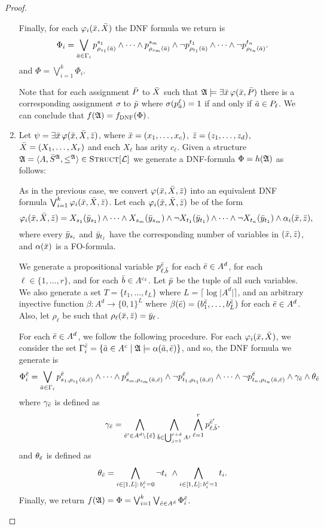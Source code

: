 \begin{proof}
\begin{enumerate}
		Finally, for each $\varphi_i(\x,\X)$ the DNF formula we return is
		\[
		\Phi_i = \bigvee_{\a\in\Gamma_i} p^{s_1}_{\rho_{s_1}(\a)} \wedge \cdots \wedge p^{s_m}_{\rho_{s_m}(\a)} \wedge \neg p^{t_1}_{\rho_{t_1}(\a)} \wedge \cdots \wedge \neg p^{t_n}_{\rho_{t_n}(\a)}.
		\]
		and $\Phi = \bigvee_{i = 1}^k \Phi_i$.
		
		Note that for each assignment $\P$ to $\X$ such that $\A\models\exists\x\,\varphi(\x,\P)$ there is a corresponding assignment $\sigma$ to $\p$ where $\sigma(p^{\ell}_{\a}) = 1$ if and only if $\a\in P_{\ell}$. We can conclude that $f(\A) = f_{\textsc{DNF}}(\Phi)$.
		
		\item Let $\psi = \exists \x\,\varphi(\x,\X,\z)$, where $\x = (x_1,\ldots,x_c)$, $\z = (z_1,\ldots,z_d)$, $\X = (X_1,\ldots,X_r)$ and each $X_{\ell}$ has arity $c_{\ell}$. Given a structure $\A = \langle A, \S^{\A}, \leq^{\A} \rangle\in\Truc$ we generate a DNF-formula $\Phi = h(\A)$ as follows:
		
		As in the previous case, we convert $\varphi(\x,\X,\z)$ into an equivalent DNF formula $\bigvee_{i = 1}^k \varphi_{i}(\x,\X,\z)$. Let each $\varphi_{i}(\x,\X,\z)$ be of the form
		\[
		\varphi_{i}(\x,\X,\z) = X_{s_1}(\y_{s_1}) \wedge \cdots \wedge X_{s_m}(\y_{s_m}) \wedge \neg X_{t_1}(\y_{t_1}) \wedge \cdots \wedge \neg X_{t_n}(\y_{t_1}) \wedge \alpha_i(\x,\z),
		\]
		where every $\y_{s_i}$ and $\y_{t_j}$ have the corresponding number of variables in $(\x,\z)$, and $\alpha(\x)$ is a FO-formula.
		
		We generate a propositional variable $p^{\e}_{\ell,\b}$ for each $\e\in A^d$, for each $\ell\in\{1,\ldots,r\}$, and for each $\b\in A^{c_{\ell}}$. Let $\p$ be the tuple of all such variables. We also generate a set $T = \{t_1,\ldots,t_{L}\}$ where $L = \lceil \log\vert A^d\vert \rceil$, and an arbitrary inyective function $\beta:A^d \to \{0,1\}^L$ where $\beta(\e) = (b^{\e}_1,\ldots,b^{\e}_L)$ for each $\e\in A^d$. Also, let $\rho_{\ell}$ be such that $\rho_{\ell}(\x,\z) = \y_{\ell}$.
		
		For each $\e\in A^d$, we follow the following procedure. For each $\varphi_i(\x,\X)$, we consider the set $\Gamma^{\e}_i = \{\a\in A^c\mid \A\models\alpha(\a,\e)\}$, and so, the DNF formula we generate is
		\[
		\Phi^{\e}_i = \bigvee_{\a\in\Gamma_i} p^{\e}_{s_1,\rho_{s_1}(\a,\e)} \wedge \cdots \wedge p^{\e}_{s_m,\rho_{s_m}(\a,\e)} \wedge \neg p^{\e}_{t_1,\rho_{t_1}(\a,\e)} \wedge \cdots \wedge \neg p^{\e}_{t_n,\rho_{t_n}(\a,\e)} \wedge \gamma_{\e} \wedge \theta_{\e}
		\]
		where $\gamma_{\e}$ is defined as
		\[
			\gamma_{\e} = \bigwedge_{\e'\in A^d\setminus\{\e\}} \bigwedge_{\b\in \bigcup_{j = 1}^{c+d} A^j} \bigwedge_{\ell = 1}^r p_{\ell,\b}^{\e'},
		\]
		and $\theta_{\e}$ is defined as
		\[
			\theta_{\e} = \bigwedge_{i\in[1,L]:\,b^{\e}_i = 0} \neg t_i\  \wedge \bigwedge_{i\in[1,L]:\,b^{\e}_i = 1} t_i.
		\]
		Finally, we return $f(\A) = \Phi = \bigvee_{i = 1}^k \bigvee_{\e\in A^d} \Phi_i^{\e}$. 
		

\end{enumerate}
\end{proof}
